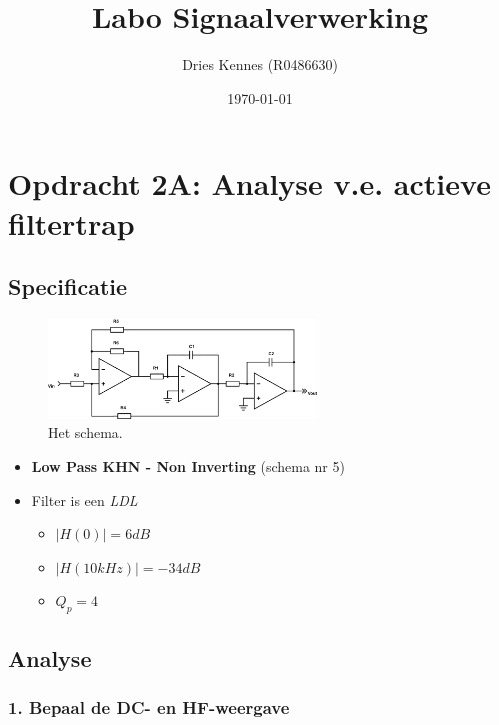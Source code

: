 \documentclass[a4paper,]{article}
\title{Labo Signaalverwerking}
\author{Dries Kennes (R0486630)}
\date{\today{}}
\providecommand{\tightlist}{%
  \setlength{\itemsep}{0pt}\setlength{\parskip}{0pt}}
\begin{document}
\maketitle

\hypertarget{opdracht-2a-analyse-v.e.-actieve-filtertrap}{%
\section{Opdracht 2A: Analyse v.e. actieve
filtertrap}\label{opdracht-2a-analyse-v.e.-actieve-filtertrap}}

\hypertarget{specificatie}{%
\subsection{Specificatie}\label{specificatie}}

\begin{figure}
\centering
\includegraphics[width=\textwidth,height=1.04167in]{assets/AF_05_LP_KHNni.png}
\caption{Het schema.}
\end{figure}

\begin{itemize}
\tightlist
\item
  \textbf{Low Pass KHN - Non Inverting} (schema nr 5)
\item
  Filter is een \emph{LDL}

  \begin{itemize}
  \tightlist
  \item
    \(|H(0)| = 6dB\)
  \item
    \(|H(10 kHz)| = -34dB\)
  \item
    \(Q_p = 4\)
  \end{itemize}
\end{itemize}

\hypertarget{analyse}{%
\subsection{Analyse}\label{analyse}}

\hypertarget{bepaal-de-dc--en-hf-weergave}{%
\subsubsection{1. Bepaal de DC- en
HF-weergave}\label{bepaal-de-dc--en-hf-weergave}}
\end{document}
